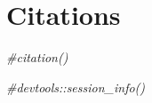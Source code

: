 \documentclass[
]{article}
\newenvironment{Shaded}{\begin{snugshade}}{\end{snugshade}}
\newcommand{\CommentTok}[1]{\textcolor[rgb]{0.56,0.35,0.01}{\textit{#1}}}
\begin{document}
\hypertarget{citations}{%
\section{Citations}\label{citations}}

\begin{Shaded}
\begin{Highlighting}[]
\CommentTok{\#citation()}

\CommentTok{\#devtools::session\_info()}
\end{Highlighting}
\end{Shaded}
\end{document}
